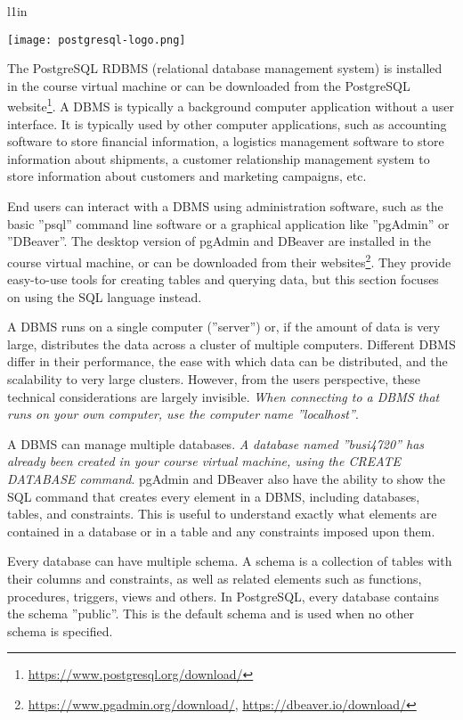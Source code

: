 \begin{wrapfigure}{l}{1in}
\begin{center}
\texttt{[image: postgresql-logo.png]}
\end{center}
\end{wrapfigure}

The PostgreSQL RDBMS (relational database management system) is installed in the course virtual machine or can be downloaded from the PostgreSQL website\footnote{\url{https://www.postgresql.org/download/}}. A DBMS is typically a background computer application without a user interface. It is typically used by other computer applications, such as accounting software to store financial information, a logistics management software to store information about shipments, a customer relationship management system to store information about customers and marketing campaigns, etc. 

End users can interact with a DBMS using administration software, such as the basic ''psql'' command line software or a graphical application like ''pgAdmin'' or ''DBeaver''. The desktop version of pgAdmin and DBeaver are installed in the course virtual machine, or can be downloaded from their websites\footnote{\url{https://www.pgadmin.org/download/}, \url{https://dbeaver.io/download/}}. They provide easy-to-use tools for creating tables and querying data, but this section focuses on using the SQL language instead.

A DBMS runs on a single computer (''server'') or, if the amount of data is very large, distributes the data across a cluster of multiple computers. Different DBMS differ in their performance, the ease with which data can be distributed, and the scalability to very large clusters. However, from the users perspective, these technical considerations are largely invisible. \emph{When connecting to a DBMS that runs on your own computer, use the computer name ''localhost''}.

A DBMS can manage multiple databases. \emph{A database named ''busi4720'' has already been created in your course virtual machine, using the CREATE DATABASE command}. pgAdmin and DBeaver also have the ability to show the SQL command that creates every element in a DBMS, including databases, tables, and constraints. This is useful to understand exactly what elements are contained in a database or in a table and any constraints imposed upon them.

Every database can have multiple schema. A schema is a collection of tables with their columns and constraints, as well as related elements such as functions, procedures, triggers, views and others. In PostgreSQL, every database contains the schema ''public''. This is the default schema and is used when no other schema is specified. 

